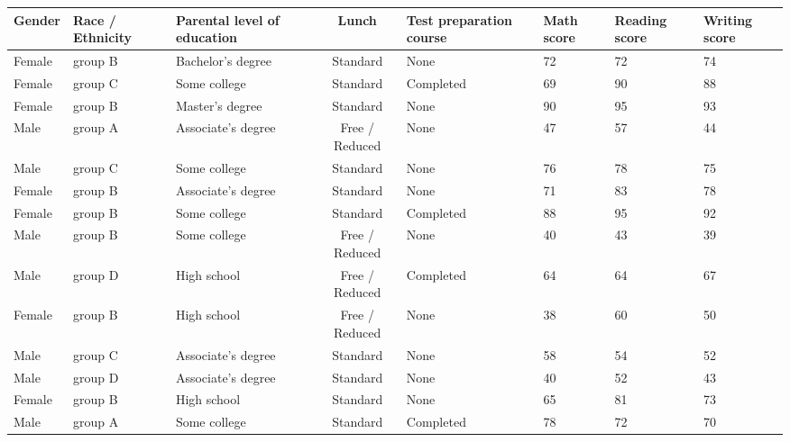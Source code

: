 \documentclass{article}
\begin{document}
	\begin{sidewaystable}
		\begin{center}
			\begin{tabular}{|m{1.5cm}|m{2cm}|m{3cm}|c|m{3cm}|m{1.5cm}|m{1.5cm}|m{1.5cm}|}
				\cellcolor{blue}\textbf{Gender} & \cellcolor{blue}\textbf{Race / Ethnicity} & \cellcolor{blue}\textbf{Parental level of education} & \cellcolor{blue}\textbf{Lunch} & \cellcolor{blue}\textbf{Test preparation course}& \cellcolor{blue}\textbf{Math score}& \cellcolor{blue}\textbf{Reading score}& \cellcolor{blue}\textbf{Writing score}\\
				\hline
				Female & group B & Bachelor's degree & Standard & None & 72 & 72& 74\\
				\hline
				Female & group C & Some college & Standard & Completed & 69 & 90 & 88\\
				\hline
				Female & group B & Master's degree & Standard & None & 90 & 95 & 93\\
				\hline
				Male & group A & Associate's degree & Free / Reduced & None & 47 & 57 & 44\\
				\hline
				Male & group C & Some college & Standard & None & 76 & 78 & 75\\
				\hline
				Female & group B & Associate's degree & Standard & None & 71 & 83 & 78\\
				\hline
				Female & group B & Some college & Standard & Completed & 88 & 95 & 92\\
				\hline
				Male & group B & Some college & Free / Reduced & None & 40 & 43 & 39\\
				\hline
				Male & group D & High school & Free / Reduced & Completed & 64 & 64 & 67\\
				\hline
				Female & group B & High school & Free / Reduced & None & 38 & 60 & 50\\
				\hline
				Male & group C & Associate's degree & Standard & None & 58 & 54 & 52\\
				\hline
				Male & group D & Associate's degree & Standard & None & 40 & 52 & 43\\
				\hline
				Female & group B & High school & Standard & None & 65 & 81 & 73\\
				\hline
				Male & group A & Some college & Standard & Completed & 78 & 72 & 70\\
				\hline
			\end{tabular} 
		\end{center}
			
	\end{sidewaystable}
\end{document}

